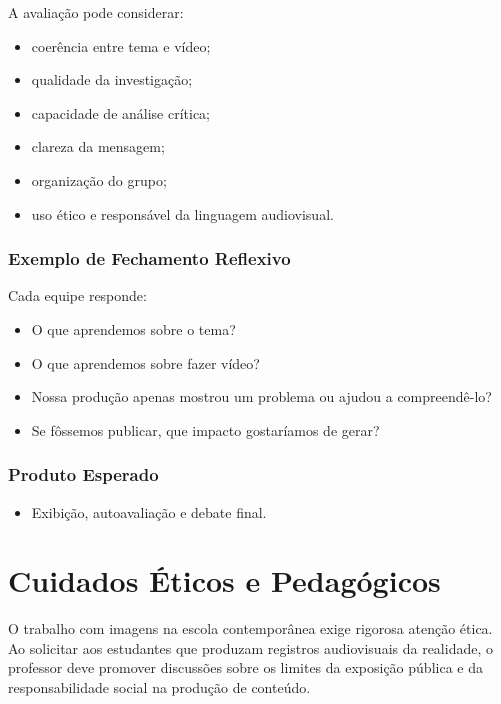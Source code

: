 \documentclass[
  letterpaper,
  DIV=11,
  numbers=noendperiod]{scrreport}
\providecommand{\tightlist}{%
  \setlength{\itemsep}{0pt}\setlength{\parskip}{0pt}}
\begin{document}
A avaliação pode considerar:

\begin{itemize}
\tightlist
\item
  coerência entre tema e vídeo;
\item
  qualidade da investigação;
\item
  capacidade de análise crítica;
\item
  clareza da mensagem;
\item
  organização do grupo;
\item
  uso ético e responsável da linguagem audiovisual.
\end{itemize}

\subsection{Exemplo de Fechamento
Reflexivo}\label{exemplo-de-fechamento-reflexivo}

Cada equipe responde:

\begin{itemize}
\tightlist
\item
  O que aprendemos sobre o tema?
\item
  O que aprendemos sobre fazer vídeo?
\item
  Nossa produção apenas mostrou um problema ou ajudou a compreendê-lo?
\item
  Se fôssemos publicar, que impacto gostaríamos de gerar?
\end{itemize}

\subsection{Produto Esperado}\label{produto-esperado-7}

\begin{itemize}
\tightlist
\item
  Exibição, autoavaliação e debate final.
\end{itemize}


\chapter{Cuidados Éticos e
Pedagógicos}\label{cuidados-uxe9ticos-e-pedaguxf3gicos}

O trabalho com imagens na escola contemporânea exige rigorosa atenção
ética. Ao solicitar aos estudantes que produzam registros audiovisuais
da realidade, o professor deve promover discussões sobre os limites da
exposição pública e da responsabilidade social na produção de conteúdo.
\end{document}
